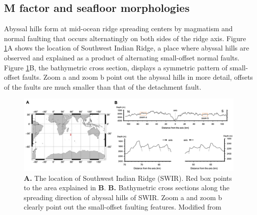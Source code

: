 \documentclass[letterpaper,12pt,notitle]{memphisthesis}                     %
\begin{document}
\subsection{M factor and seafloor morphologies}
Abyssal hills form at mid-ocean ridge spreading centers by magmatism and normal faulting that occurs alternatingly on both sides of the ridge axis. Figure \ref{fig:abyssalhill}A shows the location of Southwest Indian Ridge, a place where abyssal hills are observed and explained as a product of alternating small-offset normal faults. Figure \ref{fig:abyssalhill}B, the bathymetric cross section, displays a symmetric pattern of small-offset faults. Zoom a and zoom b point out the abyssal hills in more detail, offsets of the faults are much smaller than that of the detachment fault.
%
\begin{figure}[!htb]
	\centering
	\includegraphics[width=0.95\linewidth,trim=8 8 8 8,clip]{./figs/abyssalhill.png}
	\caption{\textbf{A.} The location of Southwest Indian Ridge (SWIR). Red box points to the area explained in \textbf{B}. \textbf{B.} Bathymetric cross sections along the spreading direction of abyssal hills of SWIR. Zoom a and zoom b clearly point out the small-offset faulting features. Modified from \citet{Mendel2003}}
	\label{fig:abyssalhill}
\end{figure}
\end{document}
